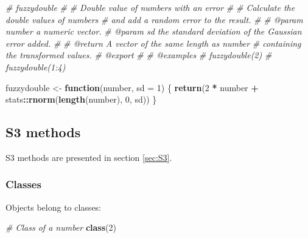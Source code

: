 \documentclass[
  12pt,
  american,
  a4paper,
  extrafontsizes,onecolumn,openright
  ]{memoir}
\newenvironment{Shaded}{\begin{snugshade}}{\end{snugshade}}
\newcommand{\AttributeTok}[1]{\textcolor[rgb]{0.13,0.29,0.53}{#1}}
\newcommand{\CommentTok}[1]{\textcolor[rgb]{0.56,0.35,0.01}{\textit{#1}}}
\newcommand{\ControlFlowTok}[1]{\textcolor[rgb]{0.13,0.29,0.53}{\textbf{#1}}}
\newcommand{\DecValTok}[1]{\textcolor[rgb]{0.00,0.00,0.81}{#1}}
\newcommand{\FunctionTok}[1]{\textcolor[rgb]{0.13,0.29,0.53}{\textbf{#1}}}
\newcommand{\NormalTok}[1]{#1}
\newcommand{\OtherTok}[1]{\textcolor[rgb]{0.56,0.35,0.01}{#1}}
\newcommand{\SpecialCharTok}[1]{\textcolor[rgb]{0.81,0.36,0.00}{\textbf{#1}}}
\begin{document}
\begin{Shaded}
\begin{Highlighting}[]
\CommentTok{\#\textquotesingle{} fuzzydouble}
\CommentTok{\#\textquotesingle{} }
\CommentTok{\#\textquotesingle{} Double value of numbers with an error}
\CommentTok{\#\textquotesingle{} }
\CommentTok{\#\textquotesingle{} Calculate the double values of numbers }
\CommentTok{\#\textquotesingle{} and add a random error to the result.}
\CommentTok{\#\textquotesingle{}}
\CommentTok{\#\textquotesingle{} @param number a numeric vector.}
\CommentTok{\#\textquotesingle{} @param sd the standard deviation of the Gaussian error added.}
\CommentTok{\#\textquotesingle{}}
\CommentTok{\#\textquotesingle{} @return A vector of the same length as \textasciigrave{}number\textasciigrave{}}
\CommentTok{\#\textquotesingle{}  containing the transformed values.}
\CommentTok{\#\textquotesingle{} @export}
\CommentTok{\#\textquotesingle{}}
\CommentTok{\#\textquotesingle{} @examples}
\CommentTok{\#\textquotesingle{} fuzzydouble(2)}
\CommentTok{\#\textquotesingle{} fuzzydouble(1:4)}

\NormalTok{fuzzydouble }\OtherTok{\textless{}{-}} \ControlFlowTok{function}\NormalTok{(number, }\AttributeTok{sd =} \DecValTok{1}\NormalTok{) \{}
  \FunctionTok{return}\NormalTok{(}\DecValTok{2} \SpecialCharTok{*}\NormalTok{ number }\SpecialCharTok{+}\NormalTok{ stats}\SpecialCharTok{::}\FunctionTok{rnorm}\NormalTok{(}\FunctionTok{length}\NormalTok{(number), }\DecValTok{0}\NormalTok{, sd))}
\NormalTok{\}}
\end{Highlighting}
\end{Shaded}

\normalsize

\subsection{S3 methods}\label{s3-methods}

S3 methods are presented in section \ref{sec:S3}.

\subsubsection{Classes}\label{classes}

Objects belong to classes:

\scriptsize

\begin{Shaded}
\begin{Highlighting}[]
\CommentTok{\# Class of a number}
\FunctionTok{class}\NormalTok{(}\DecValTok{2}\NormalTok{)}
\end{Highlighting}
\end{Shaded}
\end{document}
